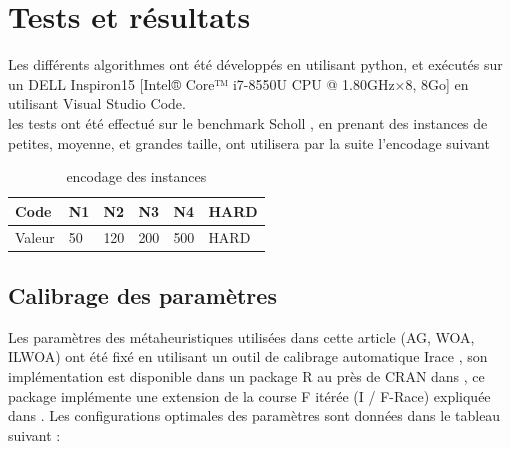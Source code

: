 \documentclass[preprint]{elsarticle}
\begin{document}
\section{Tests et résultats}
Les différents algorithmes ont été développés en utilisant python, et exécutés sur un DELL Inspiron15 [Intel® Core™ i7-8550U CPU @ 1.80GHz×8, 8Go] en utilisant Visual Studio Code. \\
les tests ont été effectué sur le benchmark Scholl \cite{Scholl}, en prenant des instances de petites, moyenne, et grandes taille, ont utilisera par la suite l’encodage suivant 
\begin{table}[h]
\centering
\begin{tabular}{l l l l l l}
\hline
\textbf{Code} & \textbf{N1} & \textbf{N2} & \textbf{N3} & \textbf{N4} & \textbf{HARD} \\
\hline
Valeur  & 50 & 120 & 200 & 500 & HARD \\
\hline
\end{tabular}
\caption{encodage des instances}
\end{table}

\subsection{Calibrage des paramètres}
Les paramètres des métaheuristiques utilisées dans cette article (AG, WOA, ILWOA) ont été fixé en utilisant un outil de calibrage automatique Irace , son implémentation est disponible dans un package R au près de CRAN dans \cite{irace}, ce package implémente une extension de la course F itérée (I / F-Race) expliquée dans \cite{survey}. 
Les configurations optimales des paramètres sont données dans le tableau suivant :\\
\end{document}
